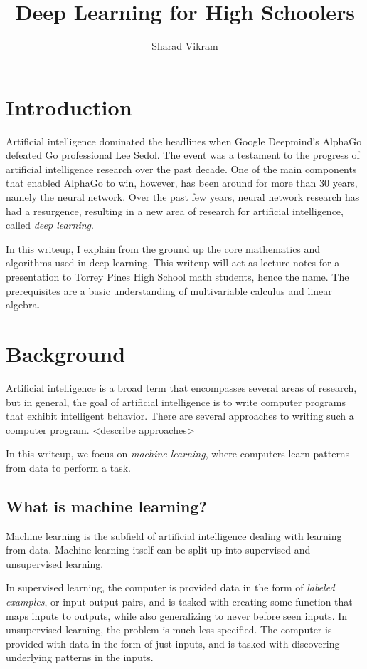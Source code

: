 \documentclass[a4paper,10pt]{article}
\title{Deep Learning for High Schoolers}
\author{Sharad Vikram}
\begin{document}
\maketitle

\section{Introduction}
Artificial intelligence dominated
the headlines when Google Deepmind's
AlphaGo defeated Go professional 
Lee Sedol. The event was a testament
to the progress of artificial intelligence
research over the past decade.
One of the main components that 
enabled AlphaGo to win,
however, has been around for
more than 30 years, namely
the neural network.
Over the past few years,
neural network research
has had a resurgence,
resulting in a new
area of research for artificial
intelligence, called \emph{deep learning}.

In this writeup, I explain
from the ground up the core mathematics
and algorithms
used in deep learning.
This writeup will act as lecture notes
for a presentation to Torrey Pines High School
math students, hence the name.
The prerequisites are
a basic understanding of multivariable calculus
and linear algebra.

\section{Background}
Artificial intelligence is a broad
term that encompasses several areas of
research, but in general,
the goal of artificial intelligence
is to write computer programs
that exhibit intelligent behavior.
There are several approaches
to writing such a computer program.
<describe approaches>

In this writeup, we focus on
\emph{machine learning},
where computers
learn patterns from
data to perform a task.

\subsection*{What is machine learning?}
Machine learning is the subfield of
artificial intelligence
dealing with learning from data.
Machine learning itself can be split up
into
supervised and unsupervised learning.

In supervised learning,
the computer is provided
data in the form of \emph{labeled examples},
or input-output pairs,
and is tasked with creating
some function that maps inputs
to outputs, while also generalizing
to never before seen inputs.
In unsupervised learning,
the problem is much less specified.
The computer is provided with data
in the form of just inputs,
and is tasked with discovering
underlying patterns in the inputs.
\end{document}
